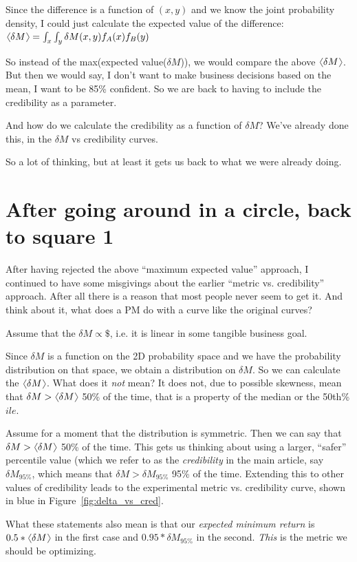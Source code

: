 \documentclass[letterpaper,12pt]{article}
\newcommand{\langl}{\begin{picture}(4.5,7)
\put(1.1,2.5){\rotatebox{60}{\line(1,0){5.5}}}
\put(1.1,2.5){\rotatebox{300}{\line(1,0){5.5}}}
\end{picture}}
\newcommand{\rangl}{\begin{picture}(4.5,7)
\put(.9,2.5){\rotatebox{120}{\line(1,0){5.5}}}
\put(.9,2.5){\rotatebox{240}{\line(1,0){5.5}}}
\end{picture}}
\newcommand{\mymean}[1]{\ensuremath{\langl{#1}\rangl}} %
\begin{document}
Since the difference is a function of \((x,y)\) and we know the joint
probability density, I could just calculate the expected value of the
difference: \(\mymean{\delta M} = \int_x \int_y \delta M(x,y) f_A(x) f_B(y)\)

So instead of the max(expected value(\(\delta M\))), we would compare
the above \(\mymean{\delta M}\). But then we would say, I don't want
to make business decisions based on the mean, I want to be 85\%
confident. So we are back to having to include the credibility as a
parameter.

And how do we calculate the credibility as a function of \(\delta M\)?
We've already done this, in the \(\delta M\) vs credibility curves.

So a lot of thinking, but at least it gets us back to what we were
already doing.

\section{After going around in a circle, back to square 1}
After having rejected the above ``maximum expected value'' approach, I
continued to have some misgivings about the earlier ``metric
vs. credibility'' approach. After all there is a reason that most
people never seem to get it. And think about it, what does a PM do
with a curve like the original curves?

Assume that the \(\delta M \propto \$\), i.e. it is linear in some tangible
business goal.

Since \(\delta M\) is a function on the 2D probability space and we
have the probability distribution on that space, we obtain a
distribution on \(\delta M\). So we can calculate the \(\mymean{\delta
  M}\). What does it {\em not} mean? It does not, due to possible
skewness, mean that \(\delta M >\mymean{\delta M}\) 50\% of the time,
that is a property of the median or the 50th\%\(ile\).

Assume for a moment that the distribution is symmetric. Then we can
say that \(\delta M >\mymean{\delta M}\) 50\% of the time. This gets
us thinking about using a larger, ``safer'' percentile value (which we
refer to as the {\em credibility} in the main article, say \(\delta
M_{95\%}\), which means that \(\delta M >\delta M_{95\%}\) 95\% of the
time. Extending this to other values of credibility leads to the
experimental metric vs. credibility curve, shown in blue in
Figure~\ref{fig:delta_vs_cred}.

What these statements also mean is that our {\em expected minimum
  return} is \(0.5*\mymean{\delta M}\) in the first case and
\(0.95*\delta M_{95\%}\) in the second. {\em This} is the metric we
should be optimizing.
\end{document}
